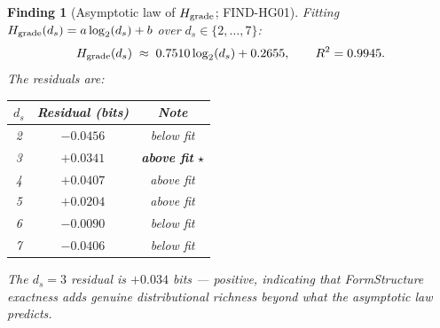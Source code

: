 \documentclass[12pt, a4paper]{article}
\newtheorem{finding}{Finding}[section]
\begin{document}
\begin{finding}[Asymptotic law of $H_{\rm grade}$; FIND-HG01]
\label{find:asymptotic}
Fitting $H_{\rm grade}(d_s) = a \log_2(d_s) + b$ over
$d_s \in \{2, \ldots, 7\}$:
\begin{equation}
  H_{\rm grade}(d_s) \;\approx\; 0.7510 \log_2(d_s) + 0.2655,
  \qquad R^2 = 0.9945.
  \label{eq:asymptotic-law}
\end{equation}
The residuals are:
\begin{center}
{\small
\renewcommand{\arraystretch}{1.20}
\begin{tabular}{ccc}
\toprule
$d_s$ & Residual (bits) & Note \\
\midrule
2 & $-0.0456$ & below fit \\
3 & $\mathbf{+0.0341}$ & \textbf{above fit} $\star$ \\
4 & $+0.0407$ & above fit \\
5 & $+0.0204$ & above fit \\
6 & $-0.0090$ & below fit \\
7 & $-0.0406$ & below fit \\
\bottomrule
\end{tabular}
}
\end{center}

The $d_s = 3$ residual is $+0.034$ bits --- positive, indicating
that FormStructure exactness adds genuine distributional richness
beyond what the asymptotic law predicts.
\end{finding}
\end{document}
